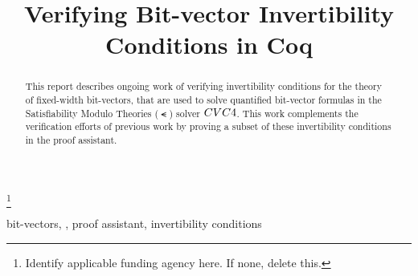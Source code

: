 \documentclass[conference]{IEEEtran}
\begin{document}
\title{Verifying Bit-vector Invertibility Conditions in Coq}
\thanks{Identify applicable funding agency here. If none, delete this.}

\author
{
\and
{}
\and
{}
\and
{}
\and
{}
}

\maketitle



\begin{abstract}
This report describes ongoing work of verifying invertibility 
conditions for the theory of fixed-width bit-vectors, 
that are used 
to solve quantified bit-vector formulas in the 
Satisfiability Modulo Theories ($\smt$) solver $CVC4$. 
This work complements the verification 
efforts of previous work by proving a subset of these
invertibility conditions in the \coq proof assistant. 

\end{abstract}

\begin{IEEEkeywords}
bit-vectors, \coq, proof assistant, invertibility conditions
\end{IEEEkeywords}
\end{document}
